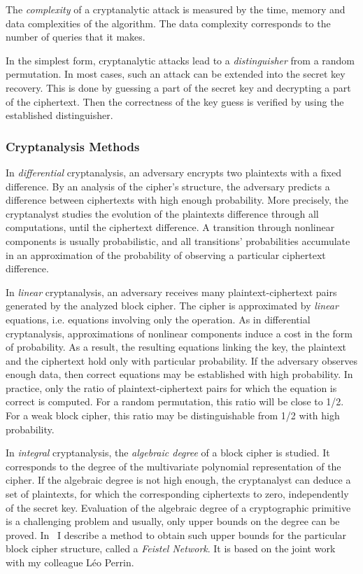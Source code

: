 The \emph{complexity} of a cryptanalytic attack is measured by the time, memory and data complexities of the algorithm. The data complexity corresponds to the number of queries that it makes. 

In the simplest form, cryptanalytic attacks lead to a \emph{distinguisher} from a random permutation. In most cases, such an attack can be extended into the secret key recovery. This is done by guessing a part of the secret key and decrypting a part of the ciphertext. Then the correctness of the key guess is verified by using the established distinguisher.

\subsubsection{Cryptanalysis Methods}

In \emph{differential} cryptanalysis, an adversary encrypts two plaintexts with a fixed \txor difference. By an analysis of the cipher's structure, the adversary predicts a difference between ciphertexts with high enough probability. More precisely, the cryptanalyst studies the evolution of the plaintexts difference through all computations, until the ciphertext difference. A transition through nonlinear components is usually probabilistic, and all transitions' probabilities accumulate in an approximation of the probability of observing a particular ciphertext difference. 

In \emph{linear} cryptanalysis, an adversary receives many plaintext-ciphertext pairs generated by the analyzed block cipher. The cipher is approximated by \emph{linear} equations, i.e. equations involving only the \txor operation. As in differential cryptanalysis, approximations of nonlinear components induce a cost in the form of probability. As a result, the resulting equations linking the key, the plaintext and the ciphertext hold only with particular probability. If the adversary observes enough data, then correct equations may be established with high probability. In practice, only the ratio of plaintext-ciphertext pairs for which the equation is correct is computed. For a random permutation, this ratio will be close to 1/2. For a weak block cipher, this ratio may be distinguishable from 1/2 with high probability.

In \emph{integral} cryptanalysis, the \emph{algebraic degree} of a block cipher is studied. It corresponds to the degree of the multivariate polynomial representation of the cipher. If the algebraic degree is not high enough, the cryptanalyst can deduce a set of plaintexts, for which the corresponding ciphertexts \txor to zero, independently of the secret key. Evaluation of the algebraic degree of a cryptographic primitive is a challenging problem and usually, only upper bounds on the degree can be proved. In~ I describe a method to obtain such upper bounds for the particular block cipher structure, called a \emph{Feistel Network}. It is based on the joint work~\cite{OurFeistel} with my colleague Léo Perrin.


